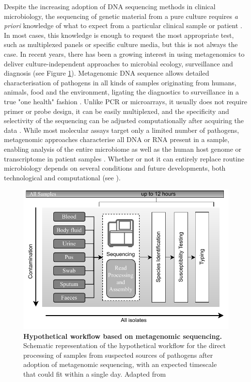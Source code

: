 Despite the increasing adoption of DNA sequencing methods in clinical microbiology, the sequencing of genetic material from a pure culture requires \textit{a priori} knowledge of what to expect from a particular clinical sample or patient \citep{schuele_future_2021}. 
In most cases, this knowledge is enough to request the most appropriate test, such as multiplexed panels or specific culture media, but this is not always the case. 
In recent years, there has been a growing interest in using metagenomics to deliver culture-independent approaches to microbial ecology, surveillance and diagnosis (see Figure \ref{fig:figure4})\citep{loman_twenty_2015, loman_high-throughput_2012}.
Metagenomic DNA sequence allows detailed characterisation of pathogens in all kinds of samples originating from humans, animals, food and the environment, ligating the diagnostics to surveillance in a true "one health" fashion \citep{rossen__2018}. 
Unlike \ac{PCR} or microarrays, it usually does not require primer or probe design, it can be easily multiplexed, and the specificity and selectivity of the sequencing can be adjusted computationally after acquiring the data \citep{dunne_next-generation_2012}.  
While most molecular assays target only a limited number of pathogens, metagenomic approaches characterise all DNA or RNA present in a sample, enabling analysis of the entire microbiome as well as the human host genome or transcriptome in patient samples \citep{chiu_clinical_2019}. 
Whether or not it can entirely replace routine microbiology depends on several conditions and future developments, both technological and computational (see ).

\begin{figure}[h!]
\centering
\includegraphics[width=\textwidth]{figures/introduction/Figure 4.pdf}
\caption{\textbf{Hypothetical workflow based on metagenomic sequencing.} Schematic representation of the hypothetical workflow for the direct processing of samples from suspected sources of pathogens after adoption of metagenomic sequencing, with an expected timescale that could fit within a single day. Adapted from \cite{didelot_transforming_2012}}
\label{fig:figure4}
\end{figure}


